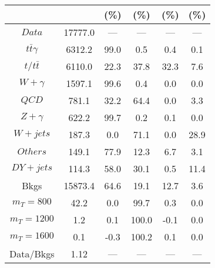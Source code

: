 \begin{figure}
\begin{minipage}[c]{0.32\textwidth}
{\begin{tabular}{cccccc}
 &  & (\%) & (\%) & (\%) & (\%)  \\
\hline
                                                                      $ Data $ &  17777.0 &  --- &  --- &  --- &  ---\\
$ t\bar{t}\gamma $ &  6312.2 &  99.0 &  0.5 &  0.4 &  0.1\\
$ t/t\bar{t} $ &  6110.0 &  22.3 &  37.8 &  32.3 &  7.6\\
$ W+\gamma $ &  1597.1 &  99.6 &  0.4 &  0.0 &  0.0\\
$ QCD $ &  781.1 &  32.2 &  64.4 &  0.0 &  3.3\\
$ Z+\gamma $ &  622.2 &  99.7 &  0.2 &  0.1 &  0.0\\
$ W+jets $ &  187.3 &  0.0 &  71.1 &  0.0 &  28.9\\
$ Others $ &  149.1 &  77.9 &  12.3 &  6.7 &  3.1\\
$ DY+jets $ &  114.3 &  58.0 &  30.1 &  0.5 &  11.4\\
Bkgs &  15873.4 &  64.6 &  19.1 &  12.7 &  3.6\\
$ m_{T} = 800 $ &  42.2 &  0.0 &  99.7 &  0.3 &  0.0\\
$ m_{T} = 1200 $ &  1.2 &  0.1 &  100.0 &  -0.1 &  0.0\\
$ m_{T} = 1600 $ &  0.1 &  -0.3 &  100.2 &  0.1 &  0.0\\
Data/Bkgs &  1.12 &  --- &  --- &  --- &  ---\\
\hline
\end{tabular}
}
\end{minipage}
\end{figure}

